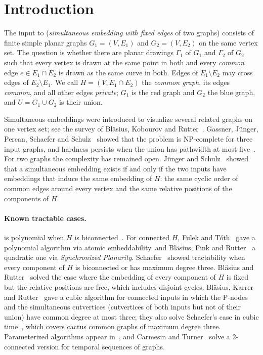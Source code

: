 \section{Introduction}\label{sec:intro}

The input to \sefe{} (\emph{simultaneous embedding with fixed edges} of two
graphs) consists of finite simple planar graphs $G_1=(V,E_1)$ and
$G_2=(V,E_2)$ on the same vertex set. The question is whether there are
planar drawings $\Gamma_1$ of $G_1$ and $\Gamma_2$ of $G_2$ such that every
vertex is drawn at the same point in both and every \emph{common} edge
$e\in E_1\cap E_2$ is drawn as the same curve in both. Edges of
$E_1\setminus E_2$ may cross edges of $E_2\setminus E_1$. We call
$H=(V,E_1\cap E_2)$ the \emph{common graph}, its edges \emph{common}, and all
other edges \emph{private}; $G_1$ is the red graph and $G_2$ the blue graph,
and $U=G_1\cup G_2$ is their union.

Simultaneous embeddings were introduced to visualize several related graphs
on one vertex set; see the survey of Bl\"asius, Kobourov and
Rutter~\cite{BKR13}. Gassner, J\"unger, Percan, Schaefer and
Schulz~\cite{GJPSS06} showed that the problem is NP-complete for three input
graphs, and hardness persists when the union has pathwidth at most
five~\cite{DF26}. For two graphs the complexity has remained open. J\"unger
and Schulz~\cite{JS09} showed that a simultaneous embedding exists if and
only if the two inputs have embeddings that induce the same embedding of
$H$: the same cyclic order of common edges around every vertex and the same
relative positions of the components of $H$.

\paragraph{Known tractable cases.}
\sefe{} is polynomial when $H$ is biconnected~\cite{ADFPR12,HJL13}. For
connected $H$, Fulek and T\'oth~\cite{FT22} gave a polynomial algorithm via
atomic embeddability, and Bl\"asius, Fink and Rutter~\cite{BFR21} a
quadratic one via \emph{Synchronized Planarity}. Schaefer~\cite{Sch13}
showed tractability when every component of $H$ is biconnected or has
maximum degree three. Bl\"asius and Rutter~\cite{BR15} solved the case where
the embedding of every component of $H$ is fixed but the relative positions
are free, which includes disjoint cycles. Bl\"asius, Karrer and
Rutter~\cite{BKR18} gave a cubic algorithm for connected inputs in which
the P-nodes and the simultaneous cutvertices (cutvertices of both inputs but
not of their union) have common degree at most three; they also solve
Schaefer's case in cubic time~\cite[Corollary~1(i)]{BKR18}, which covers
cactus common graphs of maximum degree three.
Parameterized algorithms appear in~\cite{FPR25,DF25,DF26}, and Carmesin and
Turner~\cite{CT25} solve a 2-connected version for temporal sequences of
graphs.

